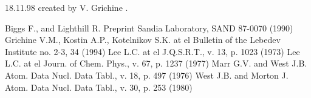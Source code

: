 18.11.98 created by V. Grichine .

\begin{thebibliography}{99}
 Biggs F., and Lighthill R.
{Preprint Sandia Laboratory, SAND 87-0070} (1990)
 Grichine V.M., Kostin A.P., Kotelnikov S.K. at el
{Bulletin of the Lebedev Institute no. 2-3, 34} (1994)
 Lee L.C. at el
{J.Q.S.R.T., v. 13, p. 1023} (1973)
 Lee L.C. at el
{Journ. of Chem. Phys., v. 67, p. 1237} (1977)
 Marr G.V. and West J.B.
{Atom. Data Nucl. Data Tabl., v. 18, p. 497} (1976)
 West J.B. and Morton J.
{Atom. Data Nucl. Data Tabl., v. 30, p. 253} (1980)
\end{thebibliography}